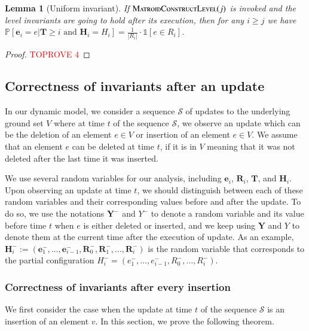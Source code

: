 \documentclass[11pt]{article}
\newtheorem{lemma}[theorem]{Lemma}
\renewcommand{\Pr}[1]{\ensuremath{\mathbb{P}\left[#1\right]}}
\newcommand{\ind}[1]{\ensuremath{\mathds{1}\left[#1\right]}}
\newcommand{\MatroidConstLevel}{\textsc{MatroidConstructLevel}}
\newcommand{\bR}{\ensuremath{\mathbf{R}}}
\newcommand{\bE}{\ensuremath{\mathbf{e}}}
\newcommand{\bT}{\ensuremath{\mathbf{T}}}
\newcommand{\bH}{\ensuremath{\mathbf{H}}}
\newcommand{\bY}{\ensuremath{\mathbf{Y}}}
\begin{document}
\begin{lemma}[Uniform invariant]
\label{lm:uniform:leveling}
If $\MatroidConstLevel{}(j)$ is invoked and 
the level invariants are going to hold after its execution, then for any $i \ge j$ we have $ \Pr{\bE_i = e |  \bT \geq i \text{ and } \bH_i = H_i  }= \frac{1}{|R_i|}\cdot \ind{e\in R_i}  $.
\end{lemma}


\begin{proof}\textcolor{red}{TOPROVE 4}\end{proof}




\subsection{Correctness of invariants after an update}
\label{sec:update:matroid}
In our dynamic model, 
we consider a sequence $\mathcal{S}$ of updates to the underlying ground set $V$ 
where at time $t$ of the sequence $\mathcal{S}$, we observe an update which can be the deletion of an element $e \in V$ or insertion of an element $e \in V$. 
We assume that an element $e$ can be deleted at time $t$, if it is in $V$ meaning that it was not deleted after the last time it was inserted. 


We use several random variables for our analysis, including $\bE_i$, $\bR_i$, $\bT$, and $\bH_i$. Upon observing an update at time $t$, 
we should distinguish between each of these random variables and their corresponding values before and after the update.
To do so, we use the notations $\bY^-$ and $Y^{-}$ to denote a random variable and its value before time $t$ when $e$ is either deleted or inserted, and we keep using $\bY$ and $Y$ to denote them at the current time after the execution of update.
As an example,
    $\bH_i^- := (\bE_1^-, \dots, \bE_{i-1}^-, \bR_0^-,  \bR_{1}^-, \dots, \bR_{i}^-)$ 
    is the random variable that corresponds to the partial configuration $H_i^- = (e_1^-, \dots, e_{i-1}^-, R_0^-, \dots, R_{i}^-)$.



\subsubsection{Correctness of invariants after every insertion}

We first consider the case when the update at time $t$ of the sequence $\mathcal{S}$ is an insertion of an element $v$. 
In this section, we prove the following theorem. 
\end{document}
